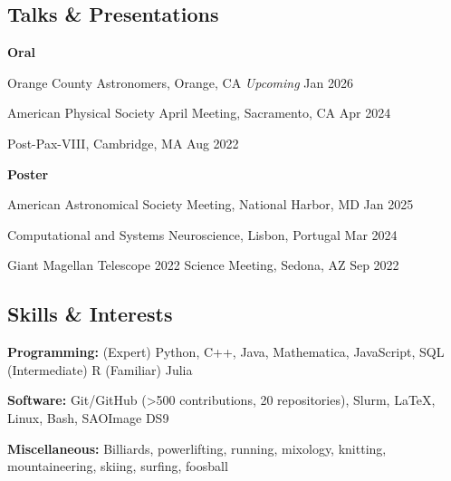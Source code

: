\documentclass[12pt,letterpaper]{article}
\begin{document}
\subsection{Talks \& Presentations}
\begin{list}{}{\cvlist}
  \item \textbf{Oral}
  \begin{bulletdescription}
    \item Orange County Astronomers, Orange, CA \hfill \textit{Upcoming} \textcolor{niceblue}{Jan 2026}
    \item American Physical Society April Meeting, Sacramento, CA \hfill \textcolor{niceblue}{Apr 2024}
    \item Post-Pax-VIII, Cambridge, MA \hfill \textcolor{niceblue}{Aug 2022}
  \end{bulletdescription}

  \item \textbf{Poster}
  \begin{bulletdescription}
    \item American Astronomical Society Meeting, National Harbor, MD \hfill \textcolor{niceblue}{Jan 2025}
    \item Computational and Systems Neuroscience, Lisbon, Portugal \hfill \textcolor{niceblue}{Mar 2024}
    \item Giant Magellan Telescope 2022 Science Meeting, Sedona, AZ \hfill \textcolor{niceblue}{Sep 2022}
  \end{bulletdescription}
\end{list}

\subsection{Skills \& Interests}
\begin{list}{}{\cvlist}
  \item \textbf{Programming:} (Expert) Python, C++, Java, Mathematica, JavaScript, SQL (Intermediate) R (Familiar) Julia
  \item \textbf{Software:} Git/GitHub (>500 contributions, 20 repositories), Slurm, \LaTeX, Linux, Bash, SAOImage DS9
  \item \textbf{Miscellaneous:} Billiards, powerlifting, running, mixology, knitting, mountaineering, skiing, surfing, foosball
\end{list}
\end{document}
